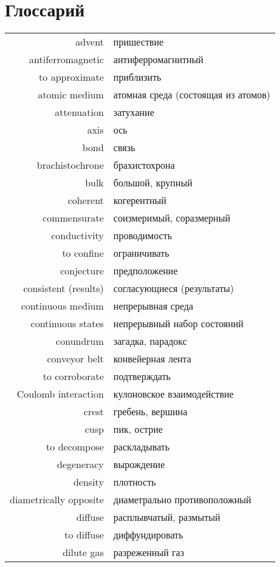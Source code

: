 \documentclass[a4paper, 14pt]{extarticle}
\begin{document}

\clearpage
{}
{}
\section*{Глоссарий}

\begin{longtable}{r@{ -- }l}
	advent & пришествие \\
	antiferromagnetic & антиферромагнитный \\
	to approximate & приблизить \\
	atomic medium & атомная среда (состоящая из атомов) \\
	attenuation & затухание \\
	axis & ось \\
	bond & связь \\
	brachistochrone & брахистохрона \\
	bulk & большой, крупный \\
	coherent & когерентный \\
	commensurate & соизмеримый, соразмерный \\
	conductivity & проводимость \\
	to confine & ограничивать \\
	conjecture & предположение \\
	consistent (results) & согласующиеся (результаты) \\
	continuous medium & непрерывная среда \\
	continuous states & непрерывный набор состояний \\
	conundrum & загадка, парадокс \\
	conveyor belt & конвейерная лента \\
	to corroborate & подтверждать \\
	Coulomb interaction & кулоновское взаимодействие \\
	crest & гребень, вершина \\
	cusp & пик, острие \\
	to decompose & раскладывать \\
	degeneracy & вырождение \\
	density & плотность \\
	diametrically opposite & диаметрально противоположный \\
	diffuse & расплывчатый, размытый \\
	to diffuse & диффундировать \\
	dilute gas & разреженный газ \\

\end{longtable}
\end{document}
